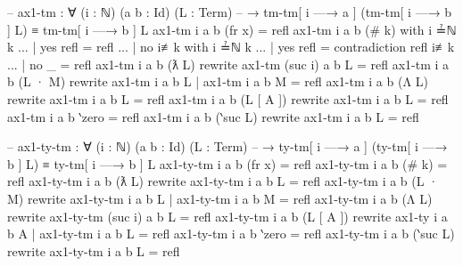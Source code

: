 \documentclass[logo,bsc,singlespacing,parskip,online]{infthesis}
\begin{document}
\begin{code}
  -- ax1-tm : ∀ (i : ℕ) (a b : Id) (L : Term)
  --   → tm-tm[ i —→ a ] (tm-tm[ i —→ b ] L) ≡ tm-tm[ i —→ b ] L
  ax1-tm i a b (fr x) = refl
  ax1-tm i a b (# k) with i ≟ℕ k
  ... | yes refl = refl
  ... | no  i≢k  with i ≟ℕ k
  ... |   yes refl = contradiction refl i≢k
  ... |   no  _    = refl
  ax1-tm i a b (ƛ L) rewrite ax1-tm (suc i) a b L = refl
  ax1-tm i a b (L · M)
    rewrite ax1-tm i a b L | ax1-tm i a b M = refl
  ax1-tm i a b (Λ L) rewrite ax1-tm i a b L = refl
  ax1-tm i a b (L [ A ]) rewrite ax1-tm i a b L = refl
  ax1-tm i a b ‵zero = refl
  ax1-tm i a b (‵suc L) rewrite ax1-tm i a b L = refl

  -- ax1-ty-tm : ∀ (i : ℕ) (a b : Id) (L : Term)
  --   → ty-tm[ i —→ a ] (ty-tm[ i —→ b ] L) ≡ ty-tm[ i —→ b ] L
  ax1-ty-tm i a b (fr x) = refl
  ax1-ty-tm i a b (# k) = refl
  ax1-ty-tm i a b (ƛ L) rewrite
    ax1-ty-tm i a b L = refl
  ax1-ty-tm i a b (L · M) rewrite
    ax1-ty-tm i a b L | ax1-ty-tm i a b M = refl
  ax1-ty-tm i a b (Λ L)
    rewrite ax1-ty-tm (suc i) a b L = refl
  ax1-ty-tm i a b (L [ A ])
    rewrite ax1-ty i a b A | ax1-ty-tm i a b L = refl
  ax1-ty-tm i a b ‵zero = refl
  ax1-ty-tm i a b (‵suc L)
    rewrite ax1-ty-tm i a b L = refl
\end{code}
\end{document}
